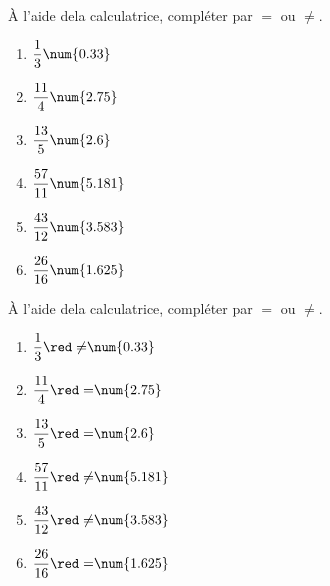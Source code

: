\begin{exercice*}
    À l'aide dela calculatrice, compléter par $=$ ou $\neq$.
    \begin{multicols}{2}
        \begin{spacing}{1.5}
            \begin{enumerate}
                \item $\dfrac{1}{3}   \dotfill \num{0.33}$
                \item $\dfrac{11}{4}  \dotfill \num{2.75}$
                \item $\dfrac{13}{5}  \dotfill \num{2.6}$
                \item $\dfrac{57}{11} \dotfill \num{5.181}$
                \item $\dfrac{43}{12} \dotfill \num{3.583}$
                \item $\dfrac{26}{16} \dotfill \num{1.625}$
            \end{enumerate}
        \end{spacing}
    \end{multicols}
\end{exercice*}
\begin{corrige}
    À l'aide dela calculatrice, compléter par $=$ ou $\neq$.
    \begin{multicols}{3}
        \begin{spacing}{1.5}
            \begin{enumerate}
                \item $\dfrac{1}{3}   {\red \neq} \num{0.33}$
                \item $\dfrac{11}{4}  {\red =} \num{2.75}$
                \item $\dfrac{13}{5}  {\red =} \num{2.6}$
                \item $\dfrac{57}{11} {\red \neq} \num{5.181}$
                \item $\dfrac{43}{12} {\red \neq} \num{3.583}$
                \item $\dfrac{26}{16} {\red =} \num{1.625}$
            \end{enumerate}
        \end{spacing}
    \end{multicols}

\end{corrige}

